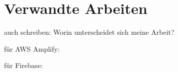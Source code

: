 \chapter{Verwandte Arbeiten}

auch schreiben: Worin unterscheidet sich meine Arbeit? 

für AWS Amplify:
\autocite{st2021handy}
\autocite{kuwamura2021application}
\autocite{naraharisetty2021cloud}

für Firebase:
\autocite{rahman2021project}
\autocite{khawas2018application}
\autocite{rahmi2017findoctor}
\autocite{li2018justiot}
\autocite{sharma2019firebase}
\autocite{bhadoria2020chatapp}